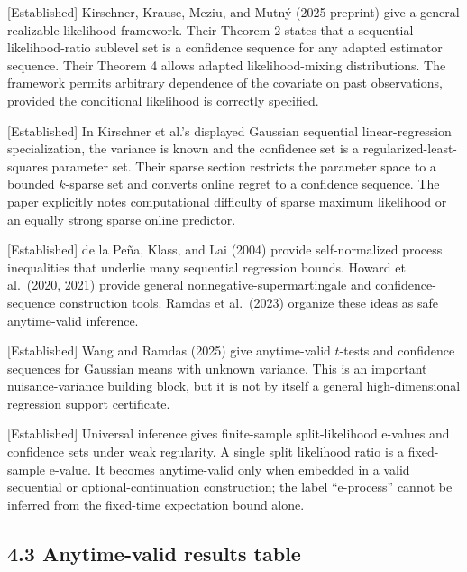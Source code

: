 \documentclass[
  english,
  11pt,
  a4paper,
]{article}
\begin{document}
{[}Established{]} Kirschner, Krause, Meziu, and Mutný (2025 preprint)
give a general realizable-likelihood framework. Their Theorem 2 states
that a sequential likelihood-ratio sublevel set is a confidence sequence
for any adapted estimator sequence. Their Theorem 4 allows adapted
likelihood-mixing distributions. The framework permits arbitrary
dependence of the covariate on past observations, provided the
conditional likelihood is correctly specified.

{[}Established{]} In Kirschner et al.'s displayed Gaussian sequential
linear-regression specialization, the variance is known and the
confidence set is a regularized-least-squares parameter set. Their
sparse section restricts the parameter space to a bounded $k$-sparse
set and converts online regret to a confidence sequence. The paper
explicitly notes computational difficulty of sparse maximum likelihood
or an equally strong sparse online predictor.

{[}Established{]} de la Peña, Klass, and Lai (2004) provide
self-normalized process inequalities that underlie many sequential
regression bounds. Howard et al.~(2020, 2021) provide general
nonnegative-supermartingale and confidence-sequence construction tools.
Ramdas et al.~(2023) organize these ideas as safe anytime-valid
inference.

{[}Established{]} Wang and Ramdas (2025) give anytime-valid $t$-tests
and confidence sequences for Gaussian means with unknown variance. This
is an important nuisance-variance building block, but it is not by
itself a general high-dimensional regression support certificate.

{[}Established{]} Universal inference gives finite-sample
split-likelihood e-values and confidence sets under weak regularity. A
single split likelihood ratio is a fixed-sample e-value. It becomes
anytime-valid only when embedded in a valid sequential or
optional-continuation construction; the label ``e-process'' cannot be
inferred from the fixed-time expectation bound alone.

\subsection{4.3 Anytime-valid results
table}\label{anytime-valid-results-table}
\end{document}
